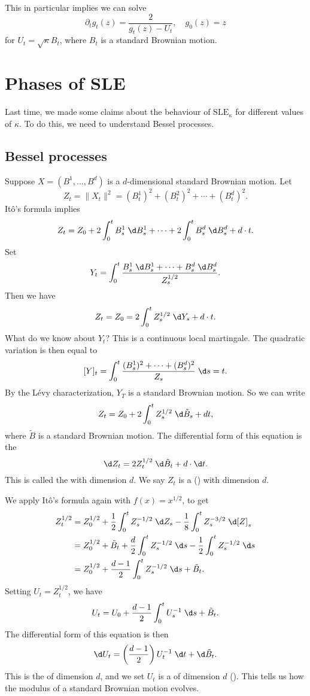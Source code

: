 \documentclass[a4paper]{article}
\newcommand\SLE{\mathrm{SLE}}
\begin{document}
This in particular implies we can solve
\[
  \partial_t g_t(z) = \frac{2}{g_t(z) - U_t},\quad g_0(z) = z
\]
for $U_t = \sqrt{\kappa} B_t$, where $B_t$ is a standard Brownian motion.

\section{Phases of SLE}
Last time, we made some claims about the behaviour of $\SLE_\kappa$ for different values of $\kappa$. To do this, we need to understand Bessel processes.

\subsection{Bessel processes}
Suppose $X = (B^1, \ldots, B^d)$ is a $d$-dimensional standard Brownian motion. Let
\[
  Z_t = \|X_t\|^2 = (B_t^1)^2 + (B_t^2)^2 + \cdots + (B_t^d)^2.
\]
It\^o's formula implies
\[
  Z_t = Z_0 + 2 \int_0^t B_s^1 \;\d B_s^1 + \cdots + 2 \int_0^t B_s^d\;\d B_s^d + d\cdot t.
\]
Set
\[
  Y_t = \int_0^t \frac{B_s^1 \;\d B_s^1 + \cdots + B_s^d \;\d B_s^d}{Z_s^{1/2}}.
\]
Then we have
\[
  Z_t = Z_0 = 2 \int_0^t Z_s^{1/2} \;\d Y_s + d\cdot t.
\]
What do we know about $Y_t$? This is a continuous local martingale. The quadratic variation is then equal to
\[
  [Y]_t = \int_0^t \frac{(B_s^1)^2 + \cdots + (B_s^d)^2}{Z_s}\;\d s = t.
\]
By the L\'evy characterization, $Y_T$ is a standard Brownian motion. So we can write
\[
  Z_t = Z_0 + 2 \int_0^t Z_s^{1/2}\;\d \tilde{B}_s + dt,
\]
where $\tilde{B}$ is a standard Brownian motion. The differential form of this equation is the
\[
  \d Z_t = 2 Z_t^{1/2} \;\d \tilde{B}_t + d \cdot \d t.
\]
This is called the  with dimension $d$. We say $Z_t$ is a  () with dimension $d$.

We apply It\^o's formula again with $f(x) = x^{1/2}$, to get
\begin{align*}
  Z_t^{1/2} &= Z_0^{1/2} + \frac{1}{2} \int_0^t Z_s^{-1/2} \;\d Z_s - \frac{1}{8} \int_0^t Z_s^{-3/2} \;\d [Z]_s\\
  &= Z_0^{1/2} + \tilde{B}_t + \frac{d}{2} \int_0^t Z_s^{-1/2}\;\d s - \frac{1}{2} \int_0^t Z_s^{-1/2} \;\d s\\
  &= Z_0^{1/2} + \frac{d - 1}{2} \int_0^t Z_s^{-1/2}\;\d s + \tilde{B}_t.
\end{align*}
Setting $U_t = Z_t^{1/2}$, we have
\[
  U_t = U_0 + \frac{d - 1}{2} \int_0^t U_s^{-1}\;\d s + \tilde{B}_t.
\]
The differential form of this equation is then
\[
  \d U_t = \left(\frac{d - 1}{2}\right) U_t^{-1}\;\d t + \d \tilde{B}_t.
\]
This is the  of dimension $d$, and we set $U_t$ is a  of dimension $d$ (). This tells us how the modulus of a standard Brownian motion evolves.
\end{document}
